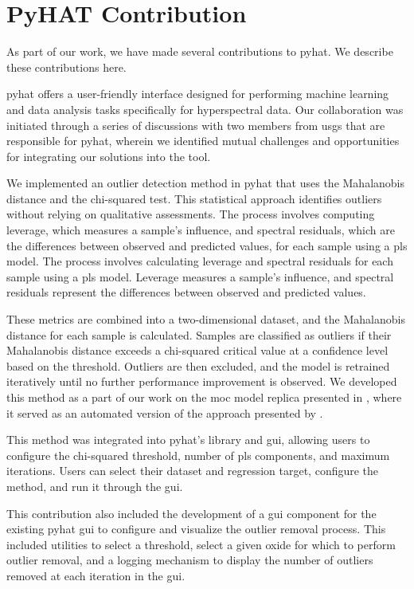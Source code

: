 \section{PyHAT Contribution}\label{sec:pyhat_contribution}
As part of our work, we have made several contributions to \gls{pyhat}.
We describe these contributions here.

\gls{pyhat} offers a user-friendly interface designed for performing machine learning and data analysis tasks specifically for hyperspectral data.
Our collaboration was initiated through a series of discussions with two members from \gls{usgs} that are responsible for \gls{pyhat}, wherein we identified mutual challenges and opportunities for integrating our solutions into the tool.

We implemented an outlier detection method in \gls{pyhat} that uses the Mahalanobis distance and the chi-squared test.
This statistical approach identifies outliers without relying on qualitative assessments.
The process involves computing leverage, which measures a sample's influence, and spectral residuals, which are the differences between observed and predicted values, for each sample using a \gls{pls} model.
The process involves calculating leverage and spectral residuals for each sample using a \gls{pls} model.
Leverage measures a sample's influence, and spectral residuals represent the differences between observed and predicted values.

These metrics are combined into a two-dimensional dataset, and the Mahalanobis distance for each sample is calculated.
Samples are classified as outliers if their Mahalanobis distance exceeds a chi-squared critical value at a confidence level based on the threshold.
Outliers are then excluded, and the model is retrained iteratively until no further performance improvement is observed.
We developed this method as a part of our work on the \gls{moc} model replica presented in \citet{p9_paper}, where it served as an automated version of the approach presented by \citet{andersonImprovedAccuracyQuantitative2017}.

This method was integrated into \gls{pyhat}'s library and \gls{gui}, allowing users to configure the chi-squared threshold, number of \gls{pls} components, and maximum iterations.
Users can select their dataset and regression target, configure the method, and run it through the \gls{gui}.

This contribution also included the development of a \gls{gui} component for the existing \gls{pyhat} \gls{gui} to configure and visualize the outlier removal process.
This included utilities to select a threshold, select a given oxide for which to perform outlier removal, and a logging mechanism to display the number of outliers removed at each iteration in the \gls{gui}.

